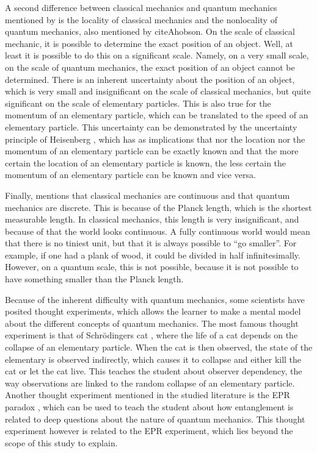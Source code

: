 \documentclass[11pt,twoside]{report} %
\begin{document}
A second difference between classical mechanics and quantum mechanics mentioned by  is the locality of classical mechanics and the nonlocality of quantum mechanics, also mentioned by citeA{hobson}. On the scale of classical mechanic, it is possible to determine the exact position of an object. Well, at least it is possible to do this on a significant scale. Namely, on a very small scale, on the scale of quantum mechanics, the exact position of an object  cannot be determined. There is an inherent uncertainty about the position of an object, which is very small and insignificant on the scale of classical mechanics, but quite significant on the scale of elementary particles. This is also true for the momentum of an elementary particle, which can be translated to the speed of an elementary particle. This uncertainty can be demonstrated by the uncertainty principle of Heisenberg \cite{henriksen, muller, velentzas}, which has as implications that nor the location nor the momentum of an elementary particle can be exactly known and that the more certain the location of an elementary particle is known, the less certain the momentum of an elementary particle can be known and vice versa.

Finally,  mentions that classical mechanics are continuous and that quantum mechanics are discrete. This is because of the Planck length, which is the shortest measurable length. In classical mechanics, this length is very insignificant, and because of that the world looks continuous. A fully continuous world would mean that there is no tiniest unit, but that it is always possible to “go smaller”. For example, if one had a plank of wood, it could be divided in half infinitesimally. However, on a quantum scale, this is not possible, because it is not possible to have something smaller than the Planck length.

Because of the inherent difficulty with quantum mechanics, some scientists have posited thought experiments, which allows the learner to make a mental model about the different concepts of quantum mechanics. The most famous thought experiment is that of Schrödingers cat \cite{muller, velentzas}, where the life of a cat depends on the collapse of an elementary particle. When the cat is then observed, the state of the elementary is observed indirectly, which causes it to collapse and either kill the cat or let the cat live. This teaches the student about observer dependency, the way observations are linked to the random collapse of an elementary particle. Another thought experiment mentioned in the studied literature is the EPR paradox \cite{kuttner, muller, velentzas}, which can be used to teach the student about how entanglement is related to deep questions about the nature of quantum mechanics. This thought experiment however is related to the EPR experiment, which lies beyond the scope of this study to explain.
\end{document}
